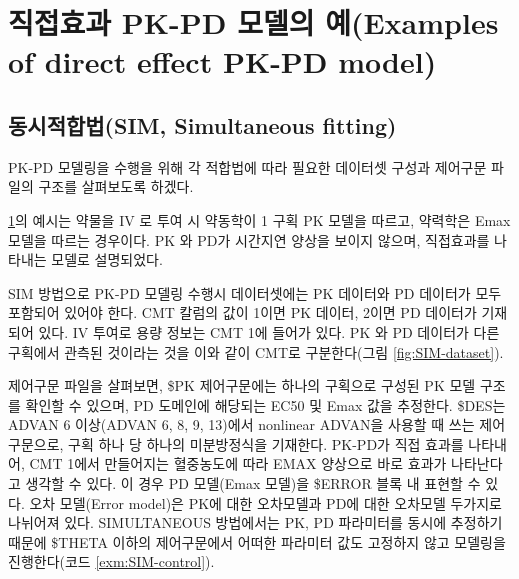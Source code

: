 \documentclass[
  11pt,
  krantz2, a4paper, twoside]{krantz}
\theoremstyle{definition}
\theoremstyle{definition}
\theoremstyle{definition}
\theoremstyle{remark}
\begin{document}
\hypertarget{direct-pkpd}{%
\section{직접효과 PK-PD 모델의 예(Examples of direct effect PK-PD model)}\label{direct-pkpd}}


\hypertarget{uxb3d9uxc2dcuxc801uxd569uxbc95sim-simultaneous-fitting}{%
\subsection{동시적합법(SIM, Simultaneous fitting)}\label{uxb3d9uxc2dcuxc801uxd569uxbc95sim-simultaneous-fitting}}


PK-PD 모델링을 수행을 위해 각 적합법에 따라 필요한 데이터셋 구성과 제어구문 파일의 구조를 살펴보도록 하겠다.

\ref{direct-pkpd}의 예시는 약물을 IV 로 투여 시 약동학이 1 구획 PK 모델을 따르고, 약력학은 Emax 모델을 따르는 경우이다. PK 와 PD가 시간지연 양상을 보이지 않으며, 직접효과를 나타내는 모델로 설명되었다.

SIM 방법으로 PK-PD 모델링 수행시 데이터셋에는 PK 데이터와 PD 데이터가 모두 포함되어 있어야 한다. CMT 칼럼의 값이 1이면 PK 데이터, 2이면 PD 데이터가 기재되어 있다. IV 투여로 용량 정보는 CMT 1에 들어가 있다. PK 와 PD 데이터가 다른 구획에서 관측된 것이라는 것을 이와 같이 CMT로 구분한다(그림 \ref{fig:SIM-dataset}).

제어구문 파일을 살펴보면, \$PK 제어구문에는 하나의 구획으로 구성된 PK 모델 구조를 확인할 수 있으며, PD 도메인에 해당되는 EC50 및 Emax 값을 추정한다. \$DES는 ADVAN 6 이상(ADVAN 6, 8, 9, 13)에서 nonlinear ADVAN을 사용할 때 쓰는 제어구문으로, 구획 하나 당 하나의 미분방정식을 기재한다. PK-PD가 직접 효과를 나타내어, CMT 1에서 만들어지는 혈중농도에 따라 EMAX 양상으로 바로 효과가 나타난다고 생각할 수 있다. 이 경우 PD 모델(Emax 모델)을 \$ERROR 블록 내 표현할 수 있다. 오차 모델(Error model)은 PK에 대한 오차모델과 PD에 대한 오차모델 두가지로 나뉘어져 있다. SIMULTANEOUS 방법에서는 PK, PD 파라미터를 동시에 추정하기 때문에 \$THETA 이하의 제어구문에서 어떠한 파라미터 값도 고정하지 않고 모델링을 진행한다(코드 \ref{exm:SIM-control}).
\end{document}
